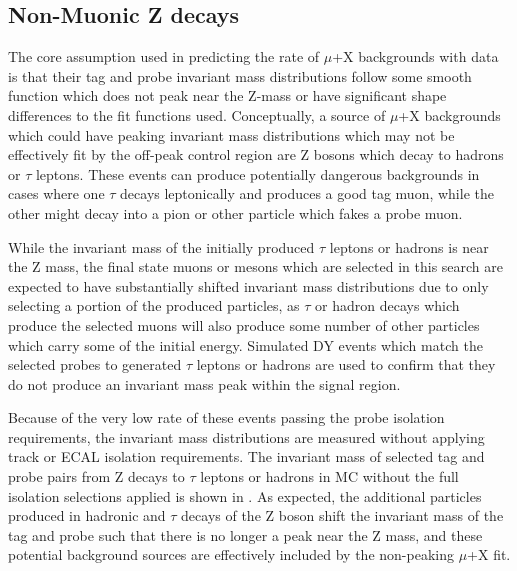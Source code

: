 \subsection{Non-Muonic Z decays}
The core assumption used in predicting the rate of $\mu$+X backgrounds with data is that their tag and probe invariant mass distributions follow some smooth function which does not peak near the Z-mass or have significant shape differences to the fit functions used.
Conceptually, a source of $\mu$+X backgrounds which could have peaking invariant mass distributions which may not be effectively fit by the off-peak control region are Z bosons which decay to hadrons or $\tau$ leptons.
These events can produce potentially dangerous backgrounds in cases where one $\tau$ decays leptonically and produces a good tag muon, while the other might decay into a pion or other particle which fakes a probe muon. 

While the invariant mass of the initially produced $\tau$ leptons or hadrons is near the Z mass, the final state muons or mesons which are selected in this search are expected to have substantially shifted invariant mass distributions due to only selecting a portion of the produced particles, as $\tau$ or hadron decays which produce the selected muons will also produce some number of other particles which carry some of the initial energy.
Simulated DY events which match the selected probes to generated $\tau$ leptons or hadrons are used to confirm that they do not produce an invariant mass peak within the signal region.

Because of the very low rate of these events passing the probe isolation requirements, the invariant mass distributions are measured without applying track or ECAL isolation requirements.
The invariant mass of selected tag and probe pairs from Z decays to $\tau$ leptons or hadrons in MC without the full isolation selections applied is shown in .
As expected, the additional particles produced in hadronic and $\tau$ decays of the Z boson shift the invariant mass of the tag and probe such that there is no longer a peak near the Z mass, and these potential background sources are effectively included by the non-peaking $\mu$+X fit.

